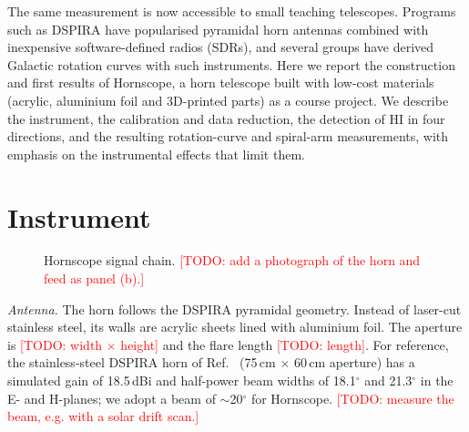 \documentclass[aip,apl,reprint,amsmath,amssymb]{revtex4-2}
\newcommand{\todo}[1]{\textcolor{red}{[TODO: #1]}}
\begin{document}
The same measurement is now accessible to small teaching telescopes. Programs such as DSPIRA\cite{DSPIRA} have popularised pyramidal horn antennas combined with inexpensive software-defined radios (SDRs), and several groups have derived Galactic rotation curves with such instruments.\cite{Bhattacharjee2026,Liu2008,PhysicsOpenLab2020} Here we report the construction and first results of Hornscope, a horn telescope built with low-cost materials (acrylic, aluminium foil and 3D-printed parts) as a course project. We describe the instrument, the calibration and data reduction, the detection of HI in four directions, and the resulting rotation-curve and spiral-arm measurements, with emphasis on the instrumental effects that limit them.

\section{Instrument}

\begin{figure}[t]
\centering
{}
\caption{Hornscope signal chain. \todo{add a photograph of the horn and feed as panel (b).}}
\label{fig:chain}
\end{figure}

\textit{Antenna.} The horn follows the DSPIRA pyramidal geometry.\cite{DSPIRA,Bhattacharjee2026} Instead of laser-cut stainless steel, its walls are acrylic sheets lined with aluminium foil. The aperture is \todo{width $\times$ height} and the flare length \todo{length}. For reference, the stainless-steel DSPIRA horn of Ref.~ (75\,cm $\times$ 60\,cm aperture) has a simulated gain of 18.5\,dBi and half-power beam widths of 18.1$^\circ$ and 21.3$^\circ$ in the E- and H-planes; we adopt a beam of $\sim$20$^\circ$ for Hornscope. \todo{measure the beam, e.g. with a solar drift scan.}
\end{document}
